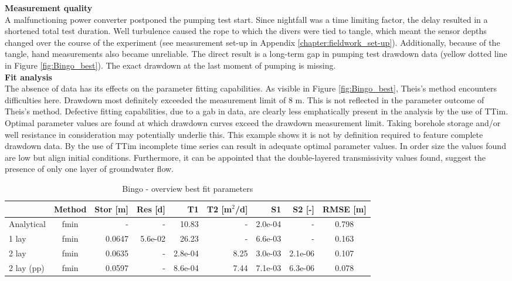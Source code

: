 \textbf{Measurement quality}\\
A malfunctioning power converter postponed the pumping test start. Since nightfall was a time limiting factor, the delay resulted in a shortened total test duration. Well turbulence caused the rope to which the divers were tied to tangle, which meant the sensor depths changed over the course of the experiment (see measurement set-up in Appendix \ref{chapter:fieldwork_set-up}). Additionally, because of the tangle, hand measurements also became unreliable. The direct result is a long-term gap in pumping test drawdown data (yellow dotted line in Figure \ref{fig:Bingo_best}). The exact drawdown at the last moment of pumping is missing. \\

\textbf{Fit analysis} \\
The absence of data has its effects on the parameter fitting capabilities. As visible in Figure \ref{fig:Bingo_best}, Theis's method encounters difficulties here. Drawdown most definitely exceeded the measurement limit of 8 m. This is not reflected in the parameter outcome of Theis's method. Defective fitting capabilities, due to a gab in data, are clearly less emphatically present in the analysis by the use of TTim.  Optimal parameter values are found at which drawdown curves exceed the drawdown measurement limit. Taking borehole storage and/or well resistance in consideration may potentially underlie this. This example shows it is not by definition required to feature complete drawdown data. By the use of TTim incomplete time series can result in adequate optimal parameter values. In order size the values found are low but align initial conditions. Furthermore, it can be appointed that the double-layered transmissivity values found, suggest the presence of only one layer of groundwater flow. \\

\begin{table}[h!]
\small
\centering
\caption{Bingo - overview best fit parameters}
\label{tab:bing_table}
\begin{tabular}{l|c|r|r|rr|rr|c}
\hline 
\textbf{}       & \textbf{Method} & \textbf{Stor [m]} & \textbf{Res [d]} & \textbf{T1}  & \textbf{T2   [m$^2$/d]}  & \textbf{S1}  & \textbf{S2 [-]}  & \textbf{RMSE [m]} \\ \hline \hline
Analytical                & fmin             & -             & -            & 10.83      & -          & 2.0e-04    & -          & 0.798 \\
1 lay                     & fmin             & 0.0647        & 5.6e-02      & 26.23      & -          & 6.6e-03    & -          & 0.163 \\
2 lay                     & fmin             & 0.0635        & -            & 2.8e-04    & 8.25      & 3.0e-03    & 2.1e-06    & 0.107 \\
2 lay (pp)                & fmin             & 0.0597        & -            & 8.6e-04    & 7.44      & 7.1e-03    & 6.3e-06    & 0.078 \\ \hline    
\end{tabular}
\end{table}

